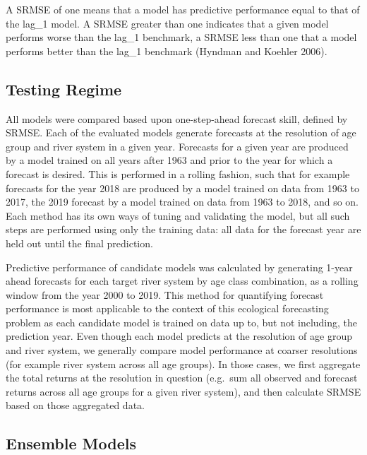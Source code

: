 \documentclass[
]{article}
\begin{document}
A SRMSE of one means that a model has predictive performance equal to that of the lag\_1 model. A SRMSE greater than one indicates that a given model performs worse than the lag\_1 benchmark, a SRMSE less than one that a model performs better than the lag\_1 benchmark (Hyndman and Koehler 2006).

\hypertarget{testing-regime}{%
\subsection*{Testing Regime}\label{testing-regime}}

All models were compared based upon one-step-ahead forecast skill, defined by SRMSE. Each of the evaluated models generate forecasts at the resolution of age group and river system in a given year. Forecasts for a given year are produced by a model trained on all years after 1963 and prior to the year for which a forecast is desired. This is performed in a rolling fashion, such that for example forecasts for the year 2018 are produced by a model trained on data from 1963 to 2017, the 2019 forecast by a model trained on data from 1963 to 2018, and so on. Each method has its own ways of tuning and validating the model, but all such steps are performed using only the training data: all data for the forecast year are held out until the final prediction.

Predictive performance of candidate models was calculated by generating 1-year ahead forecasts for each target river system by age class combination, as a rolling window from the year 2000 to 2019. This method for quantifying forecast performance is most applicable to the context of this ecological forecasting problem as each candidate model is trained on data up to, but not including, the prediction year. Even though each model predicts at the resolution of age group and river system, we generally compare model performance at coarser resolutions (for example river system across all age groups). In those cases, we first aggregate the total returns at the resolution in question (e.g.~sum all observed and forecast returns across all age groups for a given river system), and then calculate SRMSE based on those aggregated data.

\hypertarget{ensemble-models}{%
\subsection*{Ensemble Models}\label{ensemble-models}}
\end{document}
